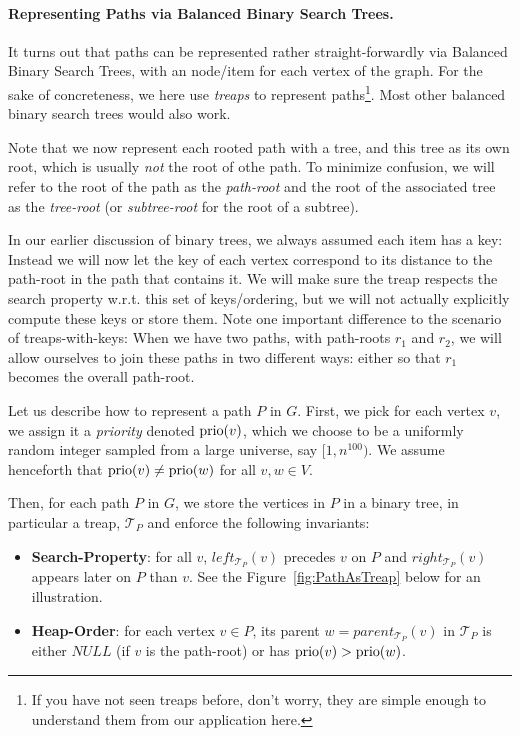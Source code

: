 \paragraph{Representing Paths via Balanced Binary Search Trees.} It turns out that paths can be represented rather straight-forwardly via Balanced Binary Search Trees, with an node/item for each vertex of the graph. For the sake of concreteness, we here use \emph{treaps} to represent paths\footnote{If you have not seen treaps before, don't worry, they are simple enough to understand them from our application here. }.
Most other balanced binary search trees would also work.

Note that we now represent each rooted path with a tree, and this tree as its own root, which is usually \emph{not} the root of othe path. To minimize confusion, we will refer to the root of the path as the \emph{path-root} and the root of the associated tree as the \emph{tree-root} (or \emph{subtree-root} for the root of a subtree).

In our earlier discussion of binary trees, we always assumed each item has a key: Instead we will now let the key of each vertex correspond to its distance to the path-root in the path that contains it.
We will make sure the treap respects the search property w.r.t. this set of keys/ordering, but we will not actually explicitly compute these keys or store them.
Note one important difference to the scenario of treaps-with-keys: When we have two paths, with path-roots $r_1$ and $r_2$, we will allow ourselves to join these paths in two different ways: either so that $r_1$ becomes the overall path-root.

Let us describe how to represent a path $P$ in $G$. First, we pick for each vertex $v$, we assign it a \emph{priority} denoted $\operatorname{prio}(v)$, which we choose to be a uniformly random integer sampled from a large universe, say $[1, n^{100})$. We assume henceforth that $\operatorname{prio}(v) \neq \operatorname{prio}(w)$ for all $v,w\in V$.

Then, for each path $P$ in $G$, we store the vertices in $P$ in a binary tree, in particular a treap, $\mathcal{T}_{P}$ and enforce the following invariants:
\begin{itemize}
      \item \textbf{Search-Property}: for all $v$, $left_{\mathcal{T}_{P}}(v)$ precedes $v$ on $P$ and $right_{\mathcal{T}_{P}}(v)$ appears later on $P$ than $v$. See the Figure~\ref{fig:PathAsTreap} below for an illustration.
    \item \textbf{Heap-Order}: for each vertex $v \in P$, its parent $w = parent_{\mathcal{T}_{P}}(v)$ in $\mathcal{T}_{P}$ is either $NULL$ (if $v$ is the path-root) or has $\operatorname{prio}(v) > \operatorname{prio}(w)$.
\end{itemize}

